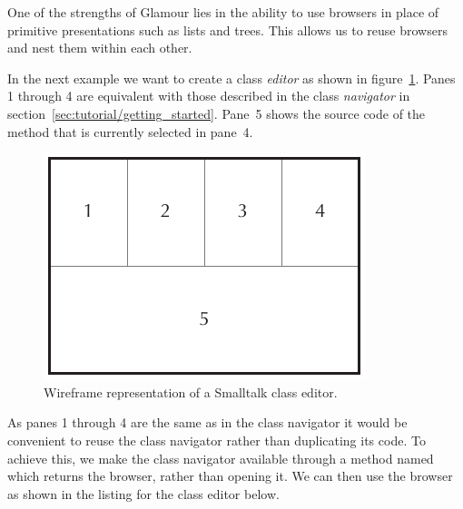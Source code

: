 \documentclass[a4paper,10pt,twoside]{book}
\begin{document}
One of the strengths of Glamour lies in the ability to use browsers in
place of primitive presentations such as lists and trees. This allows
us to reuse browsers and nest them within each other.

In the next example we want to create a class \emph{editor} as shown
in figure~\ref{fig:classbrowser_wireframe}. Panes 1 through 4 are
equivalent with those described in the class \emph{navigator} in
section~\ref{sec:tutorial/getting_started}. Pane~5 shows the source
code of the method that is currently selected in pane~4.

\begin{figure}[htbp]
\centerline{\includegraphics[width=\linewidth]{classbrowser_wireframe.pdf}}
\caption{Wireframe representation of a Smalltalk class editor.}
\label{fig:classbrowser_wireframe}
\end{figure}

As panes 1 through 4 are the same as in the class navigator it would
be convenient to reuse the class navigator rather than duplicating its
code. To achieve this, we make the class navigator available through a
method named  which returns the browser, rather than
opening it. We can then use the browser as shown in the listing for
the class editor below.

\end{document}
